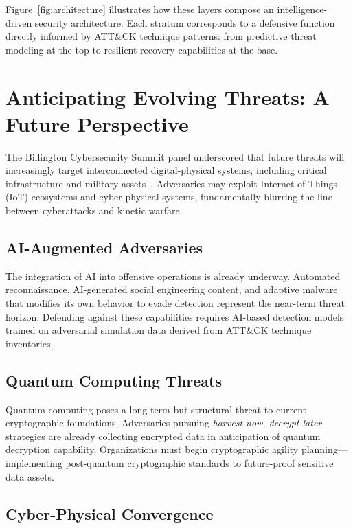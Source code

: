 \documentclass[sigconf,nonacm]{acmart}
\begin{document}
Figure~\ref{fig:architecture} illustrates how these layers compose an intelligence-driven
security architecture. Each stratum corresponds to a defensive function directly informed
by ATT\&CK technique patterns: from predictive threat modeling at the top to resilient
recovery capabilities at the base.

\section{Anticipating Evolving Threats: A Future Perspective}
\label{sec:future}

The Billington Cybersecurity Summit panel underscored that future threats will
increasingly target interconnected digital-physical systems, including critical
infrastructure and military assets~\cite{kolobashkin2025,thakur2025}. Adversaries
may exploit Internet of Things (IoT) ecosystems and cyber-physical systems,
fundamentally blurring the line between cyberattacks and kinetic warfare.

\subsection{AI-Augmented Adversaries}

The integration of AI into offensive operations is already underway. Automated
reconnaissance, AI-generated social engineering content, and adaptive malware that
modifies its own behavior to evade detection represent the near-term threat horizon.
Defending against these capabilities requires AI-based detection models trained on
adversarial simulation data derived from ATT\&CK technique inventories.

\subsection{Quantum Computing Threats}

Quantum computing poses a long-term but structural threat to current cryptographic
foundations. Adversaries pursuing \emph{harvest now, decrypt later} strategies are
already collecting encrypted data in anticipation of quantum decryption capability.
Organizations must begin cryptographic agility planning---implementing post-quantum
cryptographic standards to future-proof sensitive data assets.

\subsection{Cyber-Physical Convergence}
\end{document}

